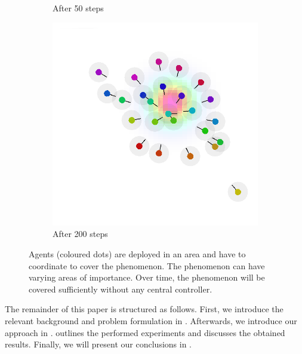 \begin{figure}[t]
\begin{subfigure}[b]{0.32\linewidth}
		\caption{After 50 steps}
		\label{fig:after}
	\end{subfigure}
	\begin{subfigure}[b]{0.32\linewidth}
		\includegraphics[width=\textwidth]{papers/acsos2023/imgs/end.png}
		\caption{After 200 steps}
		\label{fig:end}
	\end{subfigure}
	\caption[Phenomenon covering overview]{Agents (coloured dots) are deployed in an area and have to coordinate to cover the phenomenon. The phenomenon can have varying areas of importance. Over time, the phenomenon will be covered sufficiently without any central controller.
%		
		}
	\label{fig:simulations}
\end{figure}

The remainder of this paper is structured as follows. 
 First, we introduce the relevant background and problem formulation in . 
 Afterwards, we introduce our approach in . 
  outlines the performed experiments and discusses the obtained results. 
 Finally, we will present our conclusions in .

